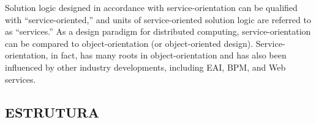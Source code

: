 Solution logic designed in accordance with service-orientation can be qualified with
“service-oriented,” and units of service-oriented solution logic are referred to as “services.”
As a design paradigm for distributed computing, service-orientation can be compared
to object-orientation (or object-oriented design). Service-orientation, in fact, has
many roots in object-orientation and has also been influenced by other industry developments,
including EAI, BPM, and Web services.
\cite{erl2009web}


\subsection{ESTRUTURA}
\vspace{-6mm}


